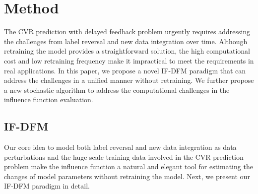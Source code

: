 \section{Method}
The CVR prediction with delayed feedback problem urgently requires addressing the challenges from label reversal and new data integration over time. Although retraining the model provides a straightforward solution, the high computational cost and low retraining frequency make it impractical to meet the requirements in real applications. In this paper, we propose a novel IF-DFM paradigm that can address the challenges in a unified manner without retraining. We further propose a new stochastic algorithm to address the computational challenges in the influence function evaluation.
\subsection{IF-DFM}
Our core idea to model both label reversal and new data integration as data perturbations and the huge scale training data involved in the CVR prediction problem make the influence function a natural and elegant tool for estimating the changes of model parameters without retraining the model. Next, we present our IF-DFM paradigm in detail.

